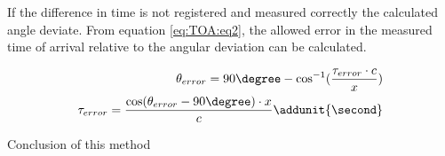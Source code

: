 If the difference in time is not registered and measured correctly the calculated angle deviate. From equation \eqref{eq:TOA:eq2}, the allowed error in the measured time of arrival relative to the angular deviation can be calculated. 

\begin{align}\label{eq:TOA:eq2}
\theta_{error} = 90\degree - \cos^{-1} ( \frac{ \tau_{error} \cdot c }{x} ) \nonumber \\
\tau_{error} = \frac{\cos(\theta_{error} - 90\degree) \cdot x}{c} \addunit{\second}
\end{align}
\startexplain
{}
\stopexplain


Conclusion of this method
